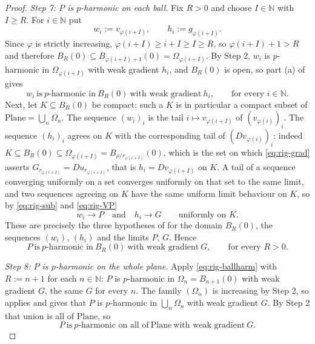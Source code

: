 \begin{proof}
\emph{Step 7: $P$ is $p$-harmonic on each ball.}  Fix $R>0$ and choose $I\in\mathbb{N}$ with
$I\ge R$.  For $i\in\mathbb{N}$ put
\[
  w_i:=v_{\varphi(i+I)},\qquad h_i:=g_{\varphi(i+I)} .
\]
Since $\varphi$ is strictly increasing, $\varphi(i+I)\ge i+I\ge I\ge R$, so
$\varphi(i+I)+1>R$ and therefore $B_R(0)\subseteq B_{\varphi(i+I)+1}(0)=\Omega_{\varphi(i+I)}$.
By Step 2, $w_i$ is $p$-harmonic in $\Omega_{\varphi(i+I)}$ with weak gradient $h_i$, and
$B_R(0)$ is open, so part (a) of  gives
\[
  w_i\ \text{is}\ p\text{-harmonic in}\ B_R(0)\ \text{with weak gradient}\ h_i,
  \qquad\text{for every }i\in\mathbb{N}.
\]
Next, let $K\subseteq B_R(0)$ be compact; such a $K$ is in particular a compact subset of
$\mathrm{Plane}=\bigcup_n\Omega_n$.  The sequence $(w_i)_i$ is the tail
$i\mapsto v_{\varphi(i+I)}$ of $(v_{\varphi(i)})_i$.  The sequence $(h_i)_i$ agrees on $K$ with
the corresponding tail of $(Dv_{\varphi(i)})_i$: indeed
$K\subseteq B_R(0)\subseteq\Omega_{\varphi(i+I)}=B_{\rho/r_{\varphi(i+I)}}(0)$, which is the set
on which \eqref{eq:rig-grad} asserts $G_{r_{\varphi(i+I)}}=Du_{r_{\varphi(i+I)}}$, that is
$h_i=Dv_{\varphi(i+I)}$ on $K$.  A tail of a sequence converging uniformly on a set converges
uniformly on that set to the same limit, and two sequences agreeing on $K$ have the same uniform
limit behaviour on $K$, so by \eqref{eq:rig-sub} and \eqref{eq:rig-VP}
\[
  w_i\to P\quad\text{and}\quad h_i\to G\qquad\text{uniformly on }K .
\]
These are precisely the three hypotheses of  for the domain $B_R(0)$, the
sequences $(w_i)$, $(h_i)$ and the limits $P$, $G$.  Hence
\begin{equation}\label{eq:rig-ballharm}
  P\ \text{is}\ p\text{-harmonic in}\ B_R(0)\ \text{with weak gradient}\ G,
  \qquad\text{for every }R>0 .
\end{equation}

\emph{Step 8: $P$ is $p$-harmonic on the whole plane.}  Apply \eqref{eq:rig-ballharm} with
$R:=n+1$ for each $n\in\mathbb{N}$: $P$ is $p$-harmonic in $\Omega_n=B_{n+1}(0)$ with weak
gradient $G$, the same $G$ for every $n$.  The family $(\Omega_n)$ is increasing by Step 2, so
 applies and gives that $P$ is $p$-harmonic in
$\bigcup_n\Omega_n$ with weak gradient $G$.  By Step 2 that union is all of $\mathrm{Plane}$, so
\begin{equation}\label{eq:rig-univ}
  P\ \text{is}\ p\text{-harmonic on all of}\ \mathrm{Plane}\ \text{with weak gradient}\ G .
\end{equation}


\end{proof}
